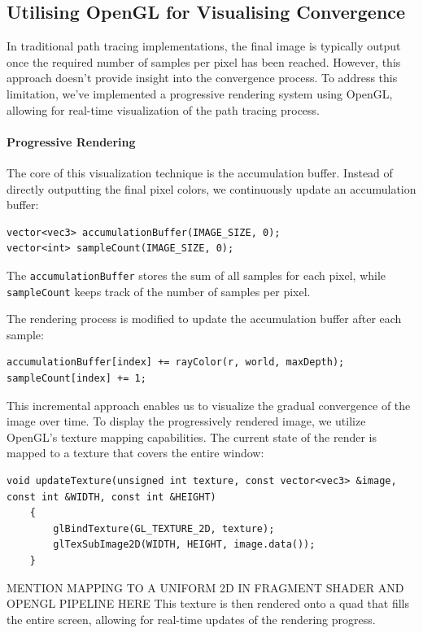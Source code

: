 \documentclass[12pt]{article}
\begin{document}
\subsection{Utilising OpenGL for Visualising Convergence}

In traditional path tracing implementations, the final image is typically output once the required number of samples per pixel has been reached. However, this approach doesn't provide insight into the convergence process. To address this limitation, we've implemented a progressive rendering system using OpenGL, allowing for real-time visualization of the path tracing process.

\paragraph{Progressive Rendering} The core of this visualization technique is the accumulation buffer. Instead of directly outputting the final pixel colors, we continuously update an accumulation buffer:

\begin{verbatim}
vector<vec3> accumulationBuffer(IMAGE_SIZE, 0);
vector<int> sampleCount(IMAGE_SIZE, 0);
\end{verbatim}

The \texttt{accumulationBuffer} stores the sum of all samples for each pixel, while \texttt{sampleCount} keeps track of the number of samples per pixel.

The rendering process is modified to update the accumulation buffer after each sample:

\begin{verbatim}
accumulationBuffer[index] += rayColor(r, world, maxDepth);
sampleCount[index] += 1;
\end{verbatim}

This incremental approach enables us to visualize the gradual convergence of the image over time.
To display the progressively rendered image, we utilize OpenGL's texture mapping capabilities. The current state of the render is mapped to a texture that covers the entire window:

\begin{verbatim}
void updateTexture(unsigned int texture, const vector<vec3> &image,
const int &WIDTH, const int &HEIGHT)
    {
        glBindTexture(GL_TEXTURE_2D, texture);
        glTexSubImage2D(WIDTH, HEIGHT, image.data());
    }
\end{verbatim}

MENTION MAPPING TO A UNIFORM 2D IN FRAGMENT SHADER AND OPENGL PIPELINE HERE
This texture is then rendered onto a quad that fills the entire screen, allowing for real-time updates of the rendering progress.
\end{document}
